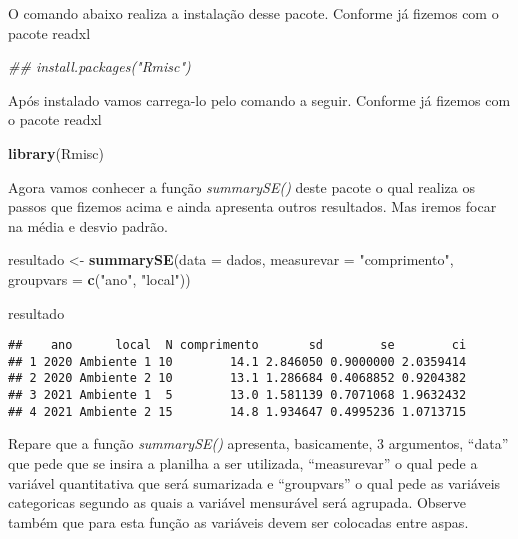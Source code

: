 \documentclass[]{book}
\newenvironment{Shaded}{\begin{snugshade}}{\end{snugshade}}
\newcommand{\CommentTok}[1]{\textcolor[rgb]{0.56,0.35,0.01}{\textit{#1}}}
\newcommand{\DataTypeTok}[1]{\textcolor[rgb]{0.13,0.29,0.53}{#1}}
\newcommand{\KeywordTok}[1]{\textcolor[rgb]{0.13,0.29,0.53}{\textbf{#1}}}
\newcommand{\NormalTok}[1]{#1}
\newcommand{\StringTok}[1]{\textcolor[rgb]{0.31,0.60,0.02}{#1}}
\begin{document}
O comando abaixo realiza a instalação desse pacote. Conforme já fizemos com o pacote readxl

\begin{Shaded}
\begin{Highlighting}[]
\CommentTok{## install.packages("Rmisc")}
\end{Highlighting}
\end{Shaded}

Após instalado vamos carrega-lo pelo comando a seguir. Conforme já fizemos com o pacote readxl

\begin{Shaded}
\begin{Highlighting}[]
\KeywordTok{library}\NormalTok{(Rmisc)}
\end{Highlighting}
\end{Shaded}

Agora vamos conhecer a função \emph{summarySE()} deste pacote o qual realiza os passos que fizemos acima e ainda apresenta outros resultados. Mas iremos focar na média e desvio padrão.

\begin{Shaded}
\begin{Highlighting}[]
\NormalTok{resultado <-}\StringTok{ }\KeywordTok{summarySE}\NormalTok{(}\DataTypeTok{data =}\NormalTok{ dados, }
                       \DataTypeTok{measurevar =} \StringTok{"comprimento"}\NormalTok{, }
                       \DataTypeTok{groupvars =} \KeywordTok{c}\NormalTok{(}\StringTok{"ano"}\NormalTok{, }\StringTok{"local"}\NormalTok{))}

\NormalTok{resultado}
\end{Highlighting}
\end{Shaded}

\begin{verbatim}
##    ano      local  N comprimento       sd        se        ci
## 1 2020 Ambiente 1 10        14.1 2.846050 0.9000000 2.0359414
## 2 2020 Ambiente 2 10        13.1 1.286684 0.4068852 0.9204382
## 3 2021 Ambiente 1  5        13.0 1.581139 0.7071068 1.9632432
## 4 2021 Ambiente 2 15        14.8 1.934647 0.4995236 1.0713715
\end{verbatim}

Repare que a função \emph{summarySE()} apresenta, basicamente, 3 argumentos, ``data'' que pede que se insira a planilha a ser utilizada, ``measurevar'' o qual pede a variável quantitativa que será sumarizada e ``groupvars'' o qual pede as variáveis categoricas segundo as quais a variável mensurável será agrupada. Observe também que para esta função as variáveis devem ser colocadas entre aspas.
\end{document}
